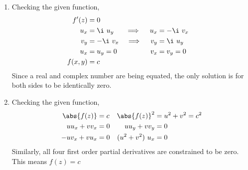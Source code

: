 \begin{enumerate}
\begin{enumerate}
              \item Checking the given function,
                    \begin{align}
                        f'(z)              & = 0          \\
                        u_x                & = \i\ u_y  &
                        \implies \quad u_x & = -\i\ v_x   \\
                        v_y                & = -\i\ v_x &
                        \implies \quad v_y & = \i\ u_y    \\
                        u_x                & = u_y = 0  &
                        v_x                & = v_y = 0    \\
                        f(x, y)            & = c
                    \end{align}
                    Since a real and complex number are being equated, the only solution
                    is for both sides to be identically zero.

              \item Checking the given function,
                    \begin{align}
                        \abs{f(z)}       & = c               &
                        \abs{f(z)}^2     & = u^2 + v^2 = c^2   \\
                        uu_x + vv_x      & = 0               &
                        uu_y + vv_y      & = 0                 \\
                        -uv_x + vu_x     & = 0               &
                        (u^2 + v^2)\ u_x & = 0
                    \end{align}
                    Similarly, all four first order partial derivatives are constrained
                    to be zero. This means $ f(z) = c $
          \end{enumerate}
\end{enumerate}